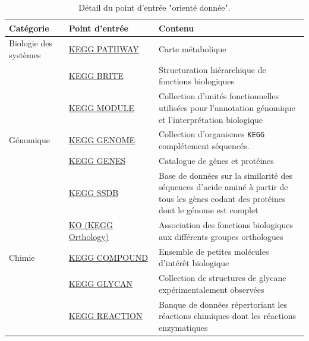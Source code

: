 \begin{refsegment}
    
    \begin{table}[H]
        \small
        \caption{Détail du point d'entrée "orienté donnée". }\label{tab:kegg_data_oriented}
        \label{tab:kegg_oriented_data} 
        \begin{tabular}{p{0.2\linewidth}|p{0.3\linewidth}|p{0.5\linewidth}}
            \toprule
            Catégorie               & Point d'entrée                                                        & Contenu \\
            \midrule
            Biologie des systèmes  & \href{http://www.genome.jp/kegg/pathway.html}{KEGG PATHWAY}            & Carte métabolique \\   
            \cline{2-3}
                                    & \href{http://www.genome.jp/kegg/brite.html}{KEGG BRITE}               & Structuration hiérarchique de fonctions biologiques \\
            \cline{2-3}             & \href{http://www.genome.jp/kegg/module.html}{KEGG MODULE}             & Collection d'unités fonctionnelles utilisées pour l'annotation génomique et l'interprétation biologique \\
            \hline
            Génomique               & \href{http://www.genome.jp/kegg/genome.html}{KEGG GENOME}             & Collection d'organismes \texttt{\gls{KEGG}} complétement séquencés. \\
            \cline{2-3}             & \href{http://www.genome.jp/kegg/genes.html}{KEGG GENES}               & Catalogue de gènes et protéines \\
            \cline{2-3}             & \href{http://www.kegg.jp/kegg/ssdb/}{KEGG SSDB}                       & Base de données sur la similarité des séquences d'acide aminé à partir de tous les gènes codant des protéines dont le génome est complet \\
            \cline{2-3}             & \href{http://www.genome.jp/kegg/ko.html}{KO (KEGG Orthology)}         & Association des fonctions biologiques aux différents groupes orthologues  \\
            \hline
            Chimie                  & \href{http://www.genome.jp/kegg/compound/}{KEGG COMPOUND}             & Ensemble de petites molécules d'intérêt biologique\\
            \cline{2-3}             & \href{http://www.genome.jp/kegg/glycan/}{KEGG GLYCAN}                 & Collection de structures de glycane expérimentalement observées \\
            \cline{2-3}             & \href{http://www.genome.jp/kegg/reaction/}{KEGG REACTION}             & Banque de données répertoriant les réactions chimiques dont les réactions enzymatiques\\

\end{tabular}
\end{table}
\end{refsegment}
